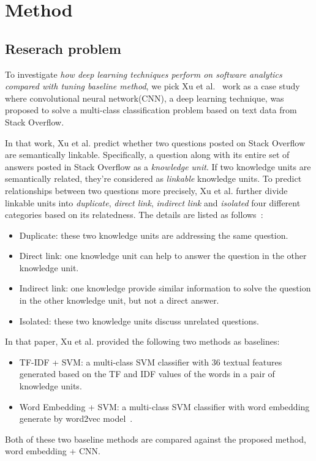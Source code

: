 \section{Method}

\subsection{Reserach problem}\label{problem}
To investigate {\it how deep learning techniques perform on software analytics compared 
with tuning baseline method}, we pick Xu et al.~\cite{xu2016predicting} work as a case study
where convolutional neural network(CNN), a deep learning technique, was proposed to 
solve a multi-class classification problem based on text data from Stack Overflow.

In that work, Xu et al. predict whether two questions posted on Stack Overflow are semantically linkable. 
Specifically,  a question along with its entire set of answers posted in Stack Overflow
as a {\it knowledge unit}. If two knowledge units are semantically related, they're considered
as {\it linkable} knowledge units. To predict relationships between two questions more precisely, 
Xu et al. further divide linkable  units 
into {\it duplicate}, {\it direct link}, {\it indirect link} and {\it isolated}  four different categories 
based on its relatedness. The details are listed as follows~\cite{xu2016predicting}:

\begin{itemize}
\item Duplicate:  these two knowledge units are addressing the same question.
\item Direct link: one knowledge unit can help to answer the question in the other knowledge unit.
\item Indirect link: one knowledge provide similar information to solve the question in the other knowledge unit, but not a direct answer.
\item Isolated: these two knowledge units discuss unrelated questions.
\end{itemize}

In that paper, Xu et al. provided the following two methods as baselines:

\begin{itemize}
\item TF-IDF + SVM: a multi-class SVM classifier with  36 textual features generated  based on the 
TF and IDF values of the words in a pair of knowledge units. 
\item Word Embedding + SVM:  a multi-class SVM classifier with word embedding generate by word2vec model~\cite{mikolov2013distributed}.
\end{itemize}
Both of these two baseline methods are compared against the proposed method, word embedding + CNN. 


